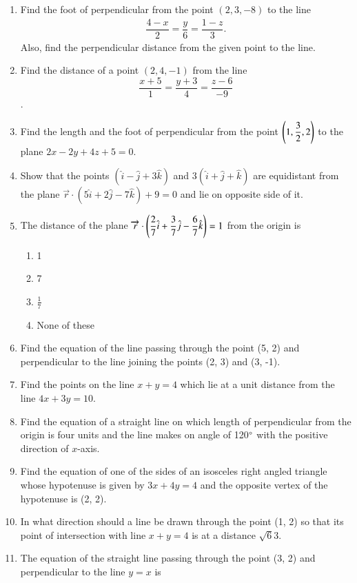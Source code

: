 \begin{enumerate}[label=\thesubsection.\arabic*, ref=\thesubsection.\theenumi]
\item Find the foot of perpendicular from the point $(2, 3, -8)$ to the line  
\begin{align*}
	\dfrac{4-x}{2}=\dfrac{y}{6}=\dfrac{1-z}{3}.
\end{align*}
	Also,  find the perpendicular distance from the given point to the line.
\item Find the distance of a point $(2, 4, -1)$ from the line $$\frac{x+5}{1}=\frac{y+3}{4}=\frac{z-6}{-9}$$.
\item Find the length and the foot of perpendicular from the point $ \left(1, \dfrac{3}{2} , 2 \right)$ to the plane $2x-2y+4z+5=0.$
\item Show that the points $(\hat{i}-\hat{j}+3\hat{k})$ and $3(\hat{i}+\hat{j}+\hat{k})$ are equidistant from the plane $\overrightarrow{r} \cdot (5\hat{i}+2\hat{j}-7\hat{k})+9=0$ and lie on opposite side of it.
\item The distance of the plane $\overrightarrow{r} \cdot \left( \dfrac{2}{7}\hat{i}+\dfrac{3}{7}\hat{j}-\dfrac{6}{7}\hat{k}\right)=1$ from the origin is 
\begin{enumerate}
	\item 1
	\item 7
	\item $\frac{1}{7}$
	\item None of these	
\end{enumerate}
\item Find the equation of the line passing through the point (5, 2) and perpendicular to the line joining the points (2, 3) and (3,  -1).
\item Find the points on the line $x+y=4$ which lie at a unit distance from the line $4x+3y=10$.
\item Find the equation of a straight line on which length of perpendicular from the origin is four units and the line makes on angle of 120$\degree$ with the positive direction of $x$-axis. 
\item Find the equation of one of the sides of an isosceles right angled triangle whose hypotenuse is given by $3x+4y=4$ and the opposite vertex of the hypotenuse is (2, 2).
\item In what direction should a line be drawn through the point (1, 2) so that its point of intersection with line $x+y=4$ is at a distance $\sqrt{6}{3}$. 
\item The equation of the straight line passing through the point (3, 2) and perpendicular to the line $y=x$ is
\begin{enumerate}

\end{enumerate}
\end{enumerate}
